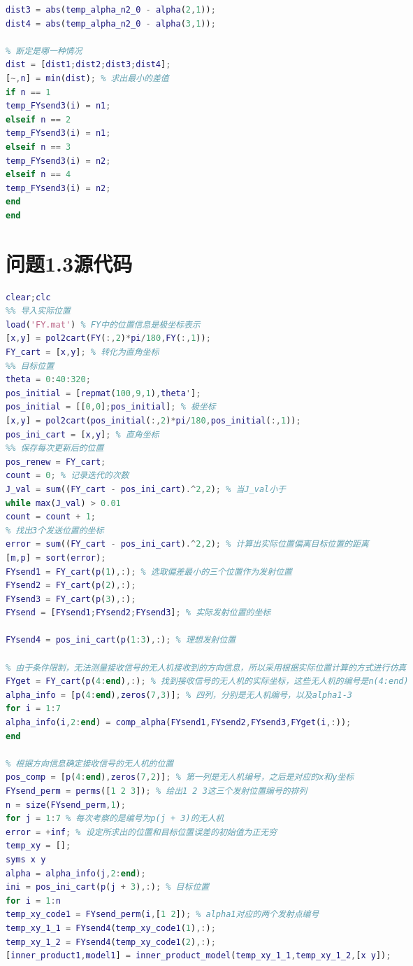 \documentclass[12pt]{ctexart}
\begin{document}
\begin{spacing}{1.5}
\begin{lstlisting}[title="shumo\_B\_22\_test.m",language=matlab]
% 求出n2-0对应的夹角和两个已知角度的偏差
dist3 = abs(temp_alpha_n2_0 - alpha(2,1));
dist4 = abs(temp_alpha_n2_0 - alpha(3,1));

% 断定是哪一种情况
dist = [dist1;dist2;dist3;dist4];
[~,n] = min(dist); % 求出最小的差值
if n == 1
temp_FYsend3(i) = n1;
elseif n == 2
temp_FYsend3(i) = n1;
elseif n == 3
temp_FYsend3(i) = n2;
elseif n == 4
temp_FYsend3(i) = n2;
end
end
\end{lstlisting}

\section{问题1.3源代码}
\begin{lstlisting}[title="shumo\_B\_1\_3.m",language=matlab]
clear;clc
%% 导入实际位置
load('FY.mat') % FY中的位置信息是极坐标表示
[x,y] = pol2cart(FY(:,2)*pi/180,FY(:,1));
FY_cart = [x,y]; % 转化为直角坐标
%% 目标位置
theta = 0:40:320;
pos_initial = [repmat(100,9,1),theta'];
pos_initial = [[0,0];pos_initial]; % 极坐标
[x,y] = pol2cart(pos_initial(:,2)*pi/180,pos_initial(:,1));
pos_ini_cart = [x,y]; % 直角坐标
%% 保存每次更新后的位置
pos_renew = FY_cart;
count = 0; % 记录迭代的次数
J_val = sum((FY_cart - pos_ini_cart).^2,2); % 当J_val小于
while max(J_val) > 0.01
count = count + 1;
% 找出3个发送位置的坐标
error = sum((FY_cart - pos_ini_cart).^2,2); % 计算出实际位置偏离目标位置的距离
[m,p] = sort(error);
FYsend1 = FY_cart(p(1),:); % 选取偏差最小的三个位置作为发射位置
FYsend2 = FY_cart(p(2),:);
FYsend3 = FY_cart(p(3),:);
FYsend = [FYsend1;FYsend2;FYsend3]; % 实际发射位置的坐标

FYsend4 = pos_ini_cart(p(1:3),:); % 理想发射位置

% 由于条件限制，无法测量接收信号的无人机接收到的方向信息，所以采用根据实际位置计算的方式进行仿真
FYget = FY_cart(p(4:end),:); % 找到接收信号的无人机的实际坐标，这些无人机的编号是n(4:end)
alpha_info = [p(4:end),zeros(7,3)]; % 四列，分别是无人机编号，以及alpha1-3
for i = 1:7
alpha_info(i,2:end) = comp_alpha(FYsend1,FYsend2,FYsend3,FYget(i,:));
end

% 根据方向信息确定接收信号的无人机的位置
pos_comp = [p(4:end),zeros(7,2)]; % 第一列是无人机编号，之后是对应的x和y坐标
FYsend_perm = perms([1 2 3]); % 给出1 2 3这三个发射位置编号的排列
n = size(FYsend_perm,1);
for j = 1:7 % 每次考察的是编号为p(j + 3)的无人机
error = +inf; % 设定所求出的位置和目标位置误差的初始值为正无穷
temp_xy = [];
syms x y
alpha = alpha_info(j,2:end);
ini = pos_ini_cart(p(j + 3),:); % 目标位置
for i = 1:n
temp_xy_code1 = FYsend_perm(i,[1 2]); % alpha1对应的两个发射点编号
temp_xy_1_1 = FYsend4(temp_xy_code1(1),:);
temp_xy_1_2 = FYsend4(temp_xy_code1(2),:);
[inner_product1,model1] = inner_product_model(temp_xy_1_1,temp_xy_1_2,[x y]);


\end{lstlisting}
\end{spacing}
\end{document}
